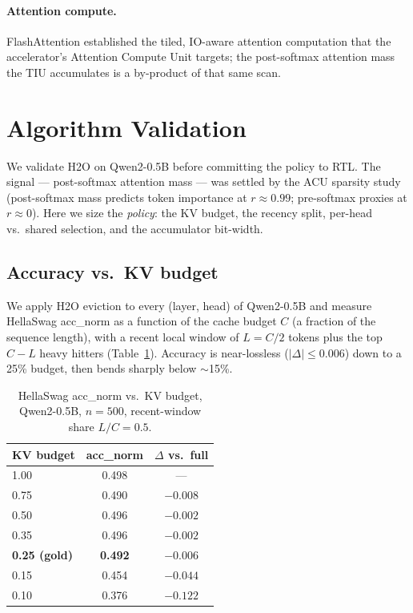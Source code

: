 \documentclass[10pt,twocolumn]{article}
\begin{document}
\paragraph{Attention compute.}
FlashAttention \citep{dao2022flashattention} established the tiled, IO-aware
attention computation that the accelerator's Attention Compute Unit targets; the
post-softmax attention mass the TIU accumulates is a by-product of that same scan.

\section{Algorithm Validation}
\label{sec:algo}

We validate H2O on Qwen2-0.5B before committing the policy to RTL. The signal ---
post-softmax attention mass --- was settled by the ACU sparsity study
(post-softmax mass predicts token importance at $r\approx0.99$; pre-softmax
proxies at $r\approx0$). Here we size the \emph{policy}: the KV budget, the
recency split, per-head vs.\ shared selection, and the accumulator bit-width.

\subsection{Accuracy vs.\ KV budget}

We apply H2O eviction to every (layer, head) of Qwen2-0.5B and measure HellaSwag
acc\_norm as a function of the cache budget $C$ (a fraction of the sequence
length), with a recent local window of $L = C/2$ tokens plus the top $C-L$ heavy
hitters (Table~\ref{tab:budget}). Accuracy is near-lossless ($|\Delta|\le0.006$)
down to a 25\% budget, then bends sharply below $\sim$15\%.

\begin{table}[tbp]
\centering
\caption{HellaSwag acc\_norm vs.\ KV budget, Qwen2-0.5B, $n{=}500$,
  recent-window share $L/C = 0.5$.}
\label{tab:budget}
\small
\begin{tabular}{lcc}
\toprule
KV budget & acc\_norm & $\Delta$ vs.\ full \\
\midrule
1.00 & 0.498 & --- \\
0.75 & 0.490 & $-0.008$ \\
0.50 & 0.496 & $-0.002$ \\
0.35 & 0.496 & $-0.002$ \\
\textbf{0.25 (gold)} & \textbf{0.492} & $\mathbf{-0.006}$ \\
0.15 & 0.454 & $-0.044$ \\
0.10 & 0.376 & $-0.122$ \\
\bottomrule
\end{tabular}
\end{table}
\end{document}
